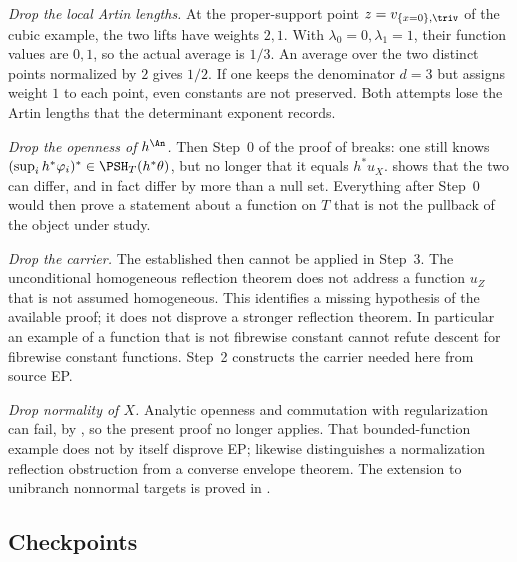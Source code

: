 \emph{Drop the local Artin lengths.}  At the proper-support point
$z=v_{\{x=0\},\triv}$ of the cubic example, the two lifts have weights
$2,1$.  With $\lambda_0=0,\lambda_1=1$, their function values are
$0,1$, so the actual average is $1/3$.
An average over the two distinct points normalized by $2$ gives $1/2$.
If one keeps the denominator $d=3$ but assigns weight $1$ to each point,
even constants are not preserved.  Both attempts lose the Artin lengths
that the determinant exponent records.

\emph{Drop the openness of $h^{\An}$.}  Then Step~0 of the proof of
 breaks: one still knows
$(\sup_ih^*\varphi_i)^*\in\PSH_T(h^*\theta)$, but no longer that it equals
$h^*u_X$.   shows that the two can differ, and
in fact differ by more than a null set.  Everything after Step~0 would then
prove a statement about a function on $T$ that is not the pullback of the
object under study.

\emph{Drop the carrier.}  The established
 then cannot be applied in Step~3.
The unconditional homogeneous reflection theorem does not address a
function $u_Z$ that is not assumed homogeneous.
This identifies a missing hypothesis of the available proof; it does
not disprove a stronger reflection theorem.
In particular an example of a function that is not fibrewise constant
cannot refute descent for fibrewise constant functions.
Step~2 constructs the carrier needed here from source EP.

\emph{Drop normality of $X$.}  Analytic openness and commutation
with regularization can fail, by ,
so the present proof no longer applies.  That bounded-function
example does not by itself disprove EP;
 likewise distinguishes a normalization
reflection obstruction from a converse envelope theorem.
The extension to unibranch nonnormal targets is proved in
.

\subsection{Checkpoints}
\label{sec:ch41-checkpoints}

